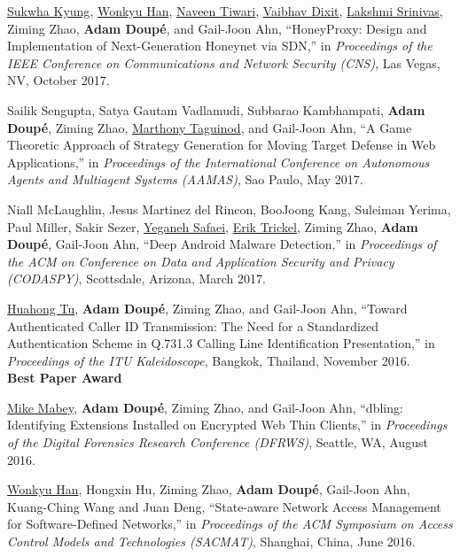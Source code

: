 \documentclass[11pt,letterpaper,sans]{moderncv}
\begin{document}
\begin{etaremune}
\item \underline{Sukwha Kyung}, \underline{Wonkyu Han},
  \underline{Naveen Tiwari}, \underline{Vaibhav Dixit},
  \underline{Lakshmi Srinivas}, Ziming Zhao, \textbf{Adam Doup\'e}, and
  Gail-Joon Ahn, ``HoneyProxy: Design and Implementation of
  Next-Generation Honeynet via SDN,'' in \emph{Proceedings of the IEEE
    Conference on Communications and Network Security (CNS)}, Las
  Vegas, NV, October 2017.

\item Sailik Sengupta, Satya Gautam Vadlamudi, Subbarao Kambhampati,
  \textbf{Adam Doup\'e}, Ziming Zhao, \underline{Marthony Taguinod},
  and Gail-Joon Ahn, ``A Game Theoretic Approach of Strategy
  Generation for Moving Target Defense in Web Applications,'' in
  \emph{Proceedings of the International Conference on Autonomous Agents
    and Multiagent Systems (AAMAS)}, Sao Paulo, May 2017.

\item Niall McLaughlin, Jesus Martinez del Rincon, BooJoong Kang,
  Suleiman Yerima, Paul Miller, Sakir Sezer, \underline{Yeganeh
    Safaei}, \underline{Erik Trickel}, Ziming Zhao, \textbf{Adam
    Doup\'e}, Gail-Joon Ahn, ``Deep Android Malware Detection,'' in
  \emph{Proceedings of the ACM on Conference on Data and Application
    Security and Privacy (CODASPY)}, Scottsdale, Arizona, March 2017.

\item \underline{Huahong Tu}, \textbf{Adam Doup\'e}, Ziming Zhao, and
  Gail-Joon Ahn, ``Toward Authenticated Caller ID Transmission: The
  Need for a Standardized Authentication Scheme in Q.731.3 Calling
  Line Identification Presentation,'' in \emph{Proceedings of the ITU
    Kaleidoscope}, Bangkok, Thailand, November 2016. \\
  \textbf{Best Paper Award}

\item \underline{Mike Mabey}, \textbf{Adam Doup\'e}, Ziming Zhao, and
  Gail-Joon Ahn, ``dbling: Identifying Extensions Installed on
  Encrypted Web Thin Clients,'' in \emph{Proceedings of the Digital
    Forensics Research Conference (DFRWS)}, Seattle, WA, August 2016.

\item \underline{Wonkyu Han}, Hongxin Hu, Ziming Zhao, \textbf{Adam
  Doup\'e}, Gail-Joon Ahn, Kuang-Ching Wang and Juan Deng,
  ``State-aware Network Access Management for Software-Defined
  Networks,'' in \emph{Proceedings of the ACM Symposium on Access
    Control Models and Technologies (SACMAT)}, Shanghai, China, June
  2016.


\end{etaremune}
\end{document}
